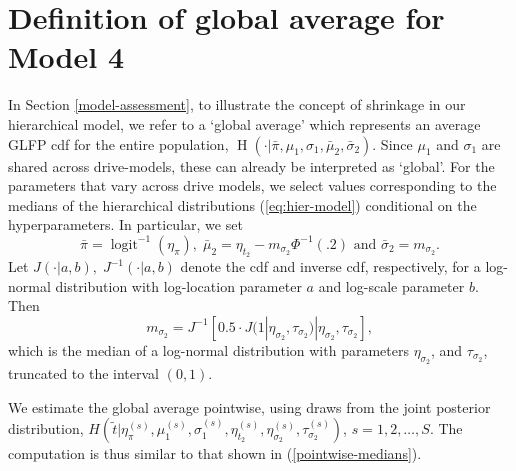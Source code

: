 \documentclass[aoas]{imsart}
\newcommand{\op}{\operatorname}
\begin{document}
\section{Definition of global average for Model 4}
\label{global-avg}
In Section \ref{model-assessment}, to illustrate the concept of shrinkage in our hierarchical model, we refer to a `global average' which represents an average GLFP cdf for the entire population, $\op{H}\left(\cdot|\bar{\pi},\mu_1,\sigma_1,\bar{\mu}_2,\bar{\sigma}_2\right)$. Since $\mu_1$ and $\sigma_1$ are shared across drive-models, these can already be interpreted as `global'. For the parameters that vary across drive models, we select values corresponding to the medians of the hierarchical distributions (\ref{eq:hier-model}) conditional on the hyperparameters. In particular, we set
$$\bar{\pi}=\op{logit}^{-1}(\eta_{\pi}),\;\bar{\mu}_2=\eta_{t_2} - m_{\sigma_2}\Phi^{-1}(.2) \mbox{ and } \bar{\sigma}_2= m_{\sigma_2}.$$
Let $J(\cdot|a,b),\;J^{-1}(\cdot|a,b)$ denote the cdf and inverse cdf, respectively, for a log-normal distribution with log-location parameter $a$ and log-scale parameter $b$. Then
$$m_{\sigma_2}=J^{-1}[0.5 \cdot J(1|\eta_{\sigma_2},\tau_{\sigma_2})|\eta_{\sigma_2}, \tau_{\sigma_2}],$$
which is the median of a log-normal distribution with parameters $\eta_{\sigma_2}$, and $\tau_{\sigma_2}$, truncated to the interval $(0, 1)$.

We estimate the global average pointwise, using draws from the joint posterior distribution, $H\left(\tilde{t}|\eta_\pi^{(s)}, \mu_1^{(s)}, \sigma_1^{(s)}, \eta_{t_2}^{(s)},\eta_{\sigma_2}^{(s)},\tau_{\sigma_2}^{(s)}\right)$, $s=1,2,\ldots,S$. The computation is thus similar to that shown in (\ref{pointwise-medians}).

\begin{supplement}
\end{supplement}
\begin{supplement}
\end{supplement}
\end{document}
